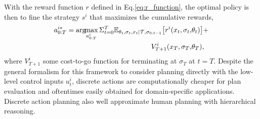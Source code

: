 \documentclass[letterpaper, 10 pt, conference]{ieeeconf}  %
\newcommand{\argmax}{\arg\!\!\max}
\begin{document}


With the reward function $r$ defined in Eq.\ref{eq:r_function}, the optimal 
policy is then to fine the strategy $s^i$ that maximizes the cumulative 
rewards,
\begin{equation}\label{eq:optimal}
\begin{aligned}
  a^{i*}_{0:T} = \argmax_{a^i_{0:T}} 
  \Sigma_{t=0}^{T} 
  \mathbb{E}_{\theta_t,\sigma_{t},x_t|\mathcal{T},\sigma_{0:t-1}} \big{[}
  r^i(x_t,\sigma_t,&\theta_t)\big{]}+ \\ 
  V^i_{T+1}(x_T,\sigma_T,&\theta_T), 
\end{aligned}
\end{equation}
where $V^i_{T+1}$ some cost-to-go function for terminating at $\sigma_T$ at 
$t=T$.
Despite the general formalism for this framework to consider planning directly 
with the low-level control inputs $u^i_t$, discrete actions are 
computationally cheaper for plan evaluation and oftentimes easily obtained for 
domain-specific applications. Discrete action planning also well approximate 
human planning with hierarchical reasoning. 
\end{document}
